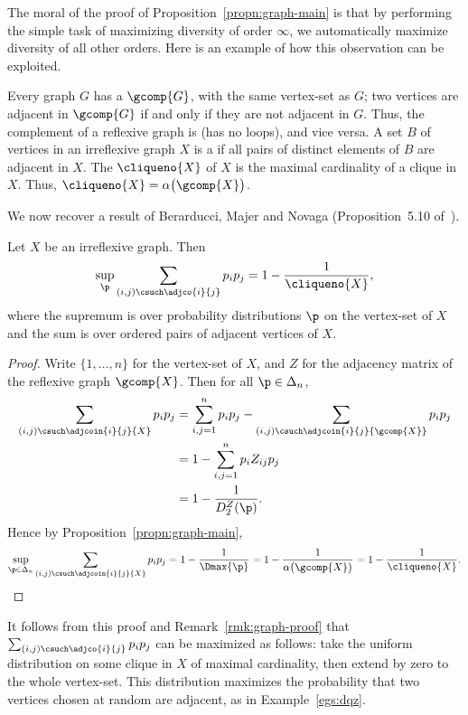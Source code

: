 The moral of the proof of Proposition~\ref{propn:graph-main} is that by
performing the simple task of maximizing diversity of order $\infty$, we
automatically maximize diversity of all other orders.  Here is an example
of how this observation can be exploited.

Every graph $G$ has a  $\gcomp{G}$, with the same
vertex-set as $G$; two vertices are adjacent in $\gcomp{G}$ if and only if
they are not adjacent in $G$.  Thus, the complement of a reflexive graph is
%
%
%
% 
(has no loops), and vice versa.  A set $B$ of vertices
in an irreflexive graph $X$ is a  if all pairs of distinct
elements of $B$ are adjacent in $X$.  The  $\cliqueno{X}$ of $X$ is the maximal cardinality of a
clique in $X$.  Thus, $\cliqueno{X} = \alpha\bigl(\gcomp{X}\bigr)$.

We now recover a result of Berarducci, Majer and Novaga (Proposition~5.10
of~\cite{BMN}).

\begin{cor}
%
%
%
% 
Let $X$ be an irreflexive graph.  Then
\[
\sup_\p \sum_{(i, j) \csuch \adjco{i}{j}} p_i p_j
=
1 - \frac{1}{\cliqueno{X}},
\]
where the supremum is over probability distributions $\p$ on the vertex-set
of $X$ and the sum is over ordered pairs of adjacent vertices of $X$.
\end{cor}

\begin{proof}
Write $\{1, \ldots, n\}$ for the vertex-set of $X$, and $Z$ for the
adjacency matrix of the reflexive graph $\gcomp{X}$.  Then for all $\p \in
\Delta_n$, 
% 
\begin{align*}
\sum_{(i, j) \csuch \adjcoin{i}{j}{X}} p_i p_j        &
=
\sum_{i, j = 1}^n p_i p_j - 
\sum_{(i, j) \csuch \adjcoin{i}{j}{\gcomp{X}}} p_i p_j  \\
&
=
1 - \sum_{i, j = 1}^n p_i Z_{ij} p_j    \\
&
=
1 - \frac{1}{D_2^Z(\p)}.
\end{align*}%
% 
Hence by Proposition~\ref{propn:graph-main},
\[
\sup_{\p \in \Delta_n} \sum_{(i, j) \csuch \adjcoin{i}{j}{X}} p_i p_j    
=
1 - \frac{1}{\Dmax{\p}}
= 
1 - \frac{1}{\alpha\bigl(\gcomp{X}\bigr)}
=
1 - \frac{1}{\cliqueno{X}}.
\]
\end{proof}

It follows from this proof and Remark~\ref{rmk:graph-proof} that $\sum_{(i,
  j)\csuch \adjco{i}{j}} p_i p_j$ can be maximized as follows: take the
uniform distribution on some clique in $X$ of maximal cardinality, then
extend by zero to the whole vertex-set.  This distribution maximizes the
probability that two vertices chosen at random are adjacent, as in
Example~\ref{egs:dqz}. 

